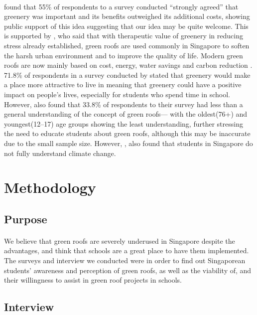 \documentclass[a4paper]{article}
\begin{document}
\begin{multicols}{2}
  \paragraph{} \cite{CommAwareGBSyd} found that 55\% of
  respondents to a survey conducted ``strongly agreed'' that greenery
  was important and its benefits outweighed its additional costs,
  showing public support of this idea suggesting that our idea may be
  quite welcome. This is supported by \cite{CFGRSG}, who said that with
  therapeutic value of greenery in reducing stress already established,
  green roofs are used commonly in Singapore to soften the harsh
  urban environment and to improve the quality of life. Modern green
  roofs are now mainly based on cost, energy, water savings and carbon
  reduction \parencite{CFGRSG}. 71.8\% of respondents in a survey
  conducted by \cite{CommAwareGBSyd} stated that greenery would make
  a place more attractive to live in meaning that greenery could have
  a positive impact on people's lives, especially for students who
  spend time in school. However, \cite{GRBuildEnSave} also found that
  33.8\% of respondents to their survey had less than a general
  understanding of the concept of green roofs--- with the oldest(76+)
  and youngest(12--17) age groups showing the least understanding,
  further stressing the need to educate students about green roofs,
  although this may be inaccurate due to the small sample size. However,
  \cite{student_carbon_footprint}, also found that students in Singapore
  do not fully understand climate change.

  \section{Methodology}
  \subsection{Purpose}
  \paragraph{} We believe that green roofs are severely underused
  in Singapore despite the advantages, and think that schools are a
  great place to have them implemented. The surveys and interview we
  conducted were in order to find out Singaporean students' awareness
  and perception of green roofs, as well as the viability of, and their
  willingness to assist in green roof projects in schools.

  \subsection{Interview}

\end{multicols}
\end{document}
